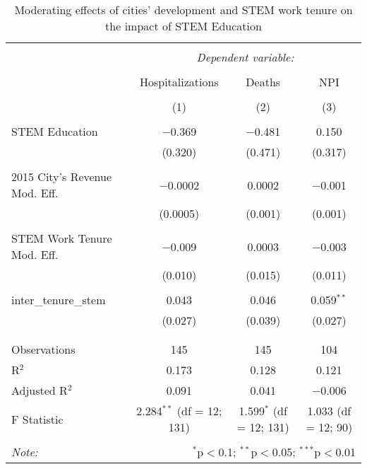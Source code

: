 
\begin{table}[!htbp] \centering 
  \caption{Moderating effects of cities’ development and STEM work tenure on the impact of STEM Education} 
  \label{} 
\begin{tabular}{@{\extracolsep{5pt}}lccc} 
\\[-1.8ex]\hline 
\hline \\[-1.8ex] 
 & \multicolumn{3}{c}{\textit{Dependent variable:}} \\ 
\cline{2-4} 
\\[-1.8ex] & Hospitalizations & Deaths & NPI \\ 
\\[-1.8ex] & (1) & (2) & (3)\\ 
\hline \\[-1.8ex] 
 STEM Education & $-$0.369 & $-$0.481 & 0.150 \\ 
  & (0.320) & (0.471) & (0.317) \\ 
  & & & \\ 
 2015 City's Revenue Mod. Eff. & $-$0.0002 & 0.0002 & $-$0.001 \\ 
  & (0.0005) & (0.001) & (0.001) \\ 
  & & & \\ 
 STEM Work Tenure Mod. Eff. & $-$0.009 & 0.0003 & $-$0.003 \\ 
  & (0.010) & (0.015) & (0.011) \\ 
  & & & \\ 
 inter\_tenure\_stem & 0.043 & 0.046 & 0.059$^{**}$ \\ 
  & (0.027) & (0.039) & (0.027) \\ 
  & & & \\ 
\hline \\[-1.8ex] 
Observations & 145 & 145 & 104 \\ 
R$^{2}$ & 0.173 & 0.128 & 0.121 \\ 
Adjusted R$^{2}$ & 0.091 & 0.041 & $-$0.006 \\ 
F Statistic & 2.284$^{**}$ (df = 12; 131) & 1.599$^{*}$ (df = 12; 131) & 1.033 (df = 12; 90) \\ 
\hline 
\hline \\[-1.8ex] 
\textit{Note:}  & \multicolumn{3}{r}{$^{*}$p$<$0.1; $^{**}$p$<$0.05; $^{***}$p$<$0.01} \\ 
\end{tabular} 
\end{table} 
